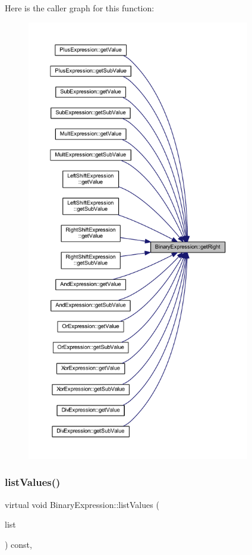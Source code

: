 Here is the caller graph for this function\+:
\nopagebreak
\begin{figure}[H]
\begin{center}
\leavevmode
\includegraphics[height=550pt]{class_binary_expression_a1f9e5f958b015a2959ad0adea1f11efd_icgraph}
\end{center}
\end{figure}
\mbox{\label{class_binary_expression_ae1a069bae9f98bcb4a4d4f2324e068c8}} 
\subsubsection{\texorpdfstring{listValues()}{listValues()}}
{\footnotesize\ttfamily virtual void Binary\+Expression\+::list\+Values (\begin{DoxyParamCaption}\item[{vector$<$ const \mbox{\hyperlink{class_pattern_value}{Pattern\+Value}} $\ast$ $>$ \&}]{list }\end{DoxyParamCaption}) const\hspace{0.3cm}{\ttfamily [inline]}, {\ttfamily [virtual]}}




